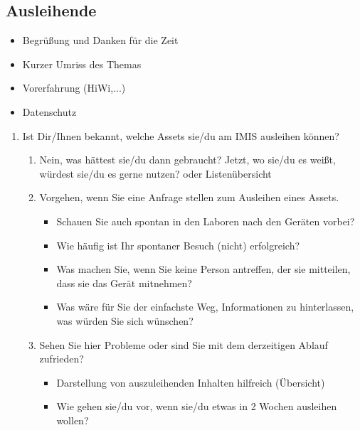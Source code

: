 \subsection{Ausleihende}
\begin{itemize}
    \item Begrüßung und Danken für die Zeit
    \item Kurzer Umriss des Themas
    \item Vorerfahrung (HiWi,...)
    \item Datenschutz
\end{itemize}

{\sffamily\color{maincolor}{Abschnitt: Jetzt}}
\begin{enumerate}
    \item Ist Dir/Ihnen bekannt, welche Assets sie/du am IMIS ausleihen können?
          \begin{enumerate}
              \item Nein, was hättest sie/du dann gebraucht? Jetzt, wo sie/du  es weißt, würdest sie/du  es gerne
                    nutzen? oder Listenübersicht
              \item Vorgehen, wenn Sie eine Anfrage stellen zum Ausleihen eines Assets.
                    \begin{itemize}
                        \item Schauen Sie auch spontan in den Laboren nach den Geräten vorbei?
                        \item Wie häufig ist Ihr spontaner Besuch (nicht) erfolgreich?
                        \item Was machen Sie, wenn Sie keine Person antreffen, der sie mitteilen, dass sie das Gerät mitnehmen?
                        \item Was wäre für Sie der einfachste Weg, Informationen zu hinterlassen, was würden Sie sich wünschen?
                    \end{itemize}
              \item Sehen Sie hier Probleme oder sind Sie mit dem derzeitigen Ablauf zufrieden?
                    \begin{itemize}
                        \item Darstellung von auszuleihenden Inhalten hilfreich (Übersicht)
                        \item Wie gehen sie/du  vor, wenn sie/du etwas in 2 Wochen ausleihen wollen?
                    \end{itemize}
          \end{enumerate}
\end{enumerate}

